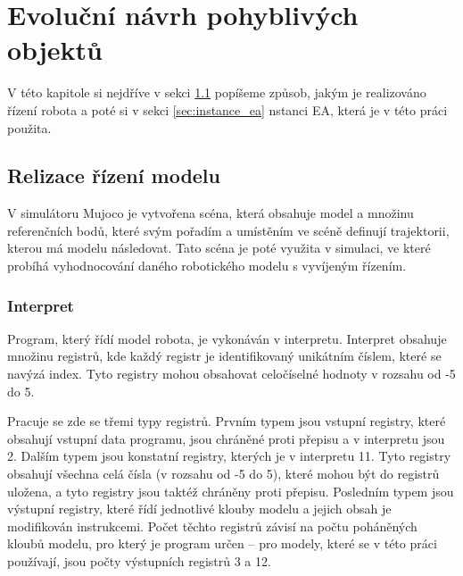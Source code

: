 
\chapter{Evoluční návrh pohyblivých objektů}
\label{chap:evolucni_navrh_pohyblivych_objektu}
V této kapitole si nejdříve v sekci \ref{sec:realizace_rizeni_modelu} popíšeme způsob, jakým je realizováno řízení robota a poté si v sekci \ref{sec:instance_ea} nstanci EA, která je v této práci použita.


\section{Relizace řízení modelu}
\label{sec:realizace_rizeni_modelu}

V simulátoru Mujoco je vytvořena scéna, která obsahuje model a množinu referenčních bodů, které svým pořadím a umístěním ve scéně definují trajektorii, kterou má modelu následovat. Tato scéna je poté využita v simulaci, ve které probíhá vyhodnocování daného robotického modelu s vyvíjeným řízením.

\subsection{Interpret}

Program, který řídí model robota, je vykonáván v interpretu.
Interpret obsahuje množinu registrů, kde každý registr je identifikovaný unikátním číslem, které se navýzá index.
Tyto registry mohou obsahovat celočíselné hodnoty v rozsahu od -5 do 5.

Pracuje se zde se třemi typy registrů.
Prvním typem jsou vstupní registry, které obsahují vstupní data programu, jsou chráněné proti přepisu a v interpretu jsou 2.
Dalším typem jsou konstatní registry, kterých je v interpretu 11.
Tyto registry obsahují všechna celá čísla (v rozsahu od -5 do 5), které mohou být do registrů uložena, a tyto registry jsou taktéž chráněny proti přepisu.
Posledním typem jsou výstupní registry, které řídí jednotlivé klouby modelu a jejich obsah je modifikován instrukcemi.
Počet těchto registrů závisí na počtu poháněných kloubů modelu, pro který je program určen -- pro modely, které se v této práci používají, jsou počty výstupních registrů 3 a 12.


